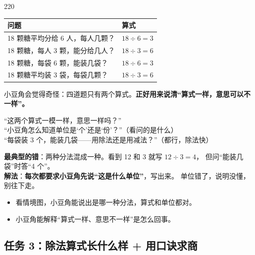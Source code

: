 \begin{lesson}{2}{20}
\begin{enumerate}
\begin{center}
\begin{tabularx}{\linewidth}{@{}p{7.2cm}X@{}}
        \toprule
        \textbf{问题} & \textbf{算式} \\
        \midrule
        18 颗糖平均分给 6 人，每人几颗？ & $18\div6=3$ \\
        18 颗糖，每人 3 颗，能分给几人？ & $18\div3=6$ \\
        18 颗糖，每袋 6 颗，能装几袋？ & $18\div6=3$ \\
        18 颗糖平均装 3 袋，每袋几颗？ & $18\div3=6$ \\
        \bottomrule
        \end{tabularx}
        \end{center}
        小豆角会觉得奇怪：四道题只有两个算式。\textbf{正好用来说清“算式一样，意思可以不一样”。}
\end{enumerate}

\begin{saybox}
“这两个算式一模一样，意思一样吗？”\\
“小豆角怎么知道单位是‘个’还是‘份’？”（看问的是什么）\\
“每袋装 3 个，能装几袋——用除法还是用减法？”（都行，除法快）
\end{saybox}

\begin{pitbox}
\textbf{最典型的错}：两种分法混成一种。看到 12 和 3 就写 $12\div3=4$，
但问“能装几袋”时答“4 个”。\\
\textbf{解法}：\textbf{每次都要求小豆角先说“这是什么单位”}，写出来。
单位错了，说明没懂，别往下走。
\end{pitbox}

\begin{passbox}
\begin{itemize}
  \item 看情境图，小豆角能说出是哪一种分法，算式和单位都对。
  \item 小豆角能解释“算式一样、意思不一样”是怎么回事。
\end{itemize}
\end{passbox}
\end{lesson}

\subsection{任务 3：除法算式长什么样 + 用口诀求商}

